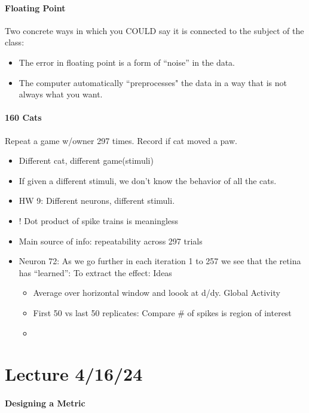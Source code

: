 \documentclass[../main.tex]{subfiles}
\begin{document}
\paragraph*{Floating Point}
Two concrete ways in which you COULD say it is connected to the subject of the class:
\begin{itemize}
    \item The error in floating point is a form of ``noise'' in the data.
    \item The computer automatically ``preprocesses" the data in a way that is not always what you
    want. 
\end{itemize}

\paragraph*{160 Cats}
Repeat a game w/owner 297 times. Record if cat moved a paw.

\begin{itemize}
    \item Different cat, different game(stimuli) 
    \item If given a different stimuli, we don't know the behavior of all the cats.
    \item HW 9: Different neurons, different stimuli.
    \item ! Dot product of spike trains is meaningless
    \item Main source of info: repeatability across 297 trials
    \item Neuron 72: As we go further in each iteration 1 to 257 we see that the retina has ``learned'':
    To extract the effect: Ideas
    \begin{itemize}
        \item Average over horizontal window and loook at d/dy. Global Activity
        \item First 50 vs last 50 replicates: Compare \# of spikes is region of interest
        \item 
    \end{itemize}
\end{itemize}

\newpage
\section*{Lecture 4/16/24}
\paragraph*{Designing a Metric}
\end{document}
